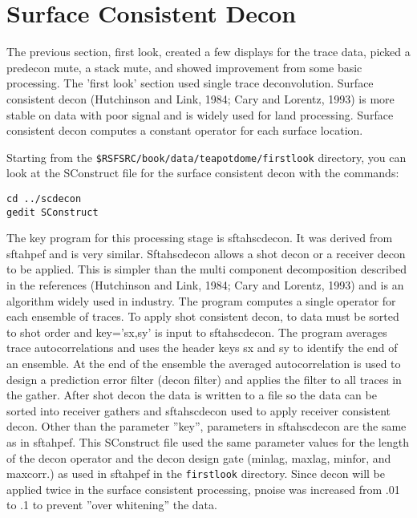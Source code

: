 

\section{Surface Consistent Decon}
The previous section, first look, created a few displays for the trace data, picked a predecon mute, a stack mute, and showed improvement from some basic processing.  The 'first look' section used single trace deconvolution.  Surface consistent decon (Hutchinson and Link, 1984; Cary and Lorentz, 1993) is more stable on data with poor signal and is widely used for land processing.  Surface consistent decon computes a constant operator for each surface location.  

Starting from the \texttt{\$RSFSRC/book/data/teapotdome/firstlook} directory, you can look at the SConstruct file for the surface consistent decon with the commands:
\begin{verbatim}
cd ../scdecon
gedit SConstruct
\end{verbatim}

The key program for this processing stage is sftahscdecon.  It was derived from sftahpef and is very similar.  Sftahscdecon allows a shot decon or a receiver decon to be applied.  This is simpler than the multi component decomposition described in the references  (Hutchinson and Link, 1984; Cary and Lorentz, 1993) and is an algorithm widely used in industry.  The program computes a single operator for each ensemble of traces.  To apply shot consistent decon, to data must be sorted to shot order and key='sx,sy' is input to sftahscdecon.  The program averages trace autocorrelations and uses the header keys sx and sy to identify the end of an ensemble.  At the end of the ensemble the averaged autocorrelation is used to design a prediction error filter (decon filter) and applies the filter to all traces in the gather.  After shot decon the data is written to a file so the data can be sorted into receiver gathers and sftahscdecon used to apply receiver consistent decon.  Other than the parameter ''key'', parameters in sftahscdecon are the same as in sftahpef.  This SConstruct file used the same parameter values for the length of the decon operator and the decon design gate (minlag, maxlag, minfor, and maxcorr.) as used in sftahpef in the \texttt{firstlook} directory.  Since decon will be applied twice in the surface consistent processing, pnoise was increased from .01 to .1 to prevent ''over whitening''  the data.

